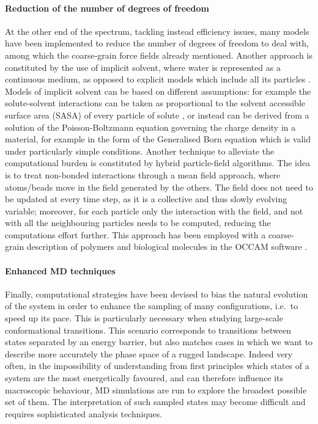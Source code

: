 \paragraph{Reduction of the number of degrees of freedom}
At the other end of the spectrum, tackling instead efficiency issues, many models have been implemented to reduce the number of degrees of freedom to deal with, among which the coarse-grain force fields already mentioned.
%
Another approach is constituted by the use of implicit solvent, where water is represented as a continuous medium, as opposed to explicit models which include all its particles \citep{Kleinjung2014}.
%
Models of implicit solvent can be based on different assumptions: for example the solute-solvent interactions can be taken as proportional to the solvent accessible surface area (SASA) of every particle of solute \citep{Fraternali1996,Kleinjung2003,Kleinjung2012,Fornili2012}, or instead can be derived from a solution of the Poisson-Boltzmann equation governing the charge density in a material, for example in the form of the Generalised Born equation \citep{Zhu2005} which is valid under particularly simple conditions.
%
Another technique to alleviate the computational burden is constituted by hybrid particle-field algorithms. The idea is to treat non-bonded interactions through a mean field approach, where atoms/beads move in the field generated by the others. The field does not need to be updated at every time step, as it is a collective and thus slowly evolving variable; moreover, for each particle only the interaction with the field, and not with all the neighbouring particles needs to be computed, reducing the computations effort further. This approach has been employed with a coarse-grain description of polymers and biological molecules in the OCCAM software \citep{Milano2009}.

\paragraph{Enhanced MD techniques}
Finally, computational strategies have been devised to bias the natural evolution of the system in order to enhance the sampling of many configurations, i.e.\ to speed up its pace.
%
This is particularly necessary when studying large-scale conformational transitions. This scenario corresponds to transitions between states separated by an energy barrier, but also matches cases in which we want to describe more accurately the phase space of a rugged landscape. Indeed very often, in the impossibility of understanding from first principles which states of a system are the most energetically favoured, and can therefore influence its macroscopic behaviour, MD simulations are run to explore the broadest possible set of them. The interpretation of such sampled states may become difficult and requires sophisticated analysis techniques.

